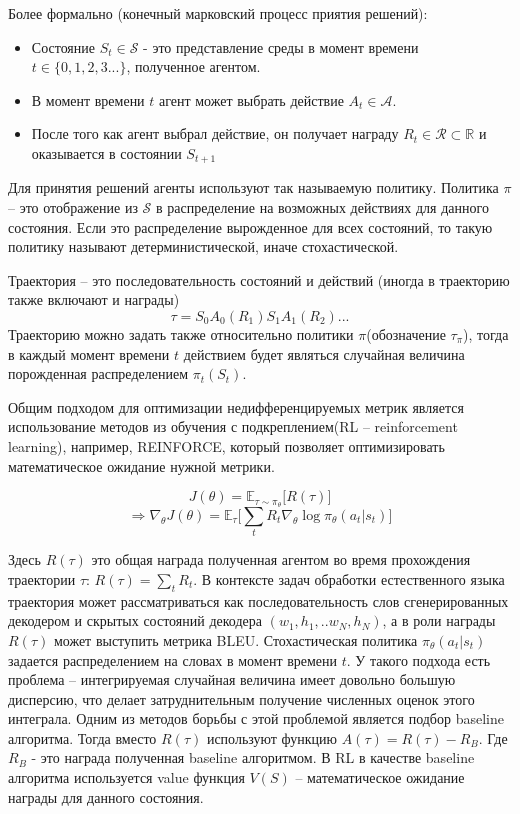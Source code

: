 \documentclass[14pt, a4paper]{extarticle}
\begin{document}
Более формально (конечный марковский процесс приятия решений):
\begin{itemize}
  \item Состояние $S_t \in \mathcal{S}$ - это представление среды в момент времени $t \in \{0, 1, 2, 3 ...\}$, полученное агентом.
  \item В момент времени $t$ агент может выбрать действие $A_t \in  \mathcal{A}$.
  \item После того как агент выбрал действие,
 он получает награду $R_t \in \mathcal{R} \subset \mathbb{R}$ и оказывается в состоянии $S_{t+1}$
\end{itemize}

Для принятия решений агенты используют так называемую политику. Политика $\pi$ -- это отображение из $\mathcal{S}$ в
распределение на возможных действиях для данного состояния. Если это распределение вырожденное для всех состояний, то такую политику называют детерминистической,
иначе стохастической.

Траектория -- это последовательность состояний и действий (иногда в траекторию также включают и  награды) $$\tau = S_0 A_0 (R_1) S_1 A_1 (R_2) ...$$
Траекторию можно задать также относительно политики $\pi$(обозначение $\tau_{\pi}$), тогда в каждый момент времени $t$ действием будет
являться случайная величина порожденная распределением $\pi_t(S_t)$.


Общим подходом для оптимизации недифференцируемых метрик является использование методов из обучения с подкреплением(RL -- reinforcement learning), 
например, REINFORCE, который позволяет оптимизировать
математическое ожидание нужной метрики.

$$J(\theta) = \mathbb{E}_{\tau\sim \pi_{\theta}} \lbrack R(\tau) \rbrack
$$
\begin{equation}
\Rightarrow \nabla_\theta J(\theta) = \mathbb{E}_{\tau} \lbrack \sum_t R_t \nabla_\theta\log \pi_{\theta}(a_t|s_t) \rbrack
\label{eq:reinforce_rule}
\end{equation}


Здесь $R(\tau)$ это общая награда полученная агентом во время прохождения траектории $\tau$: $R(\tau)=\sum_t R_t$. В контексте задач обработки естественного языка траектория может рассматриваться как последовательность слов сгенерированных декодером и скрытых состояний декодера $(w_1, h_1,..w_N, h_N)$, а в роли награды $R(\tau)$ может выступить метрика BLEU. Стохастическая политика $\pi_\theta(a_t|s_t)$ задается распределением на словах в момент времени $t$.
У такого подхода есть проблема -- интегрируемая случайная величина имеет довольно большую дисперсию, что делает затруднительным получение численных оценок этого интеграла.
Одним из методов борьбы с этой проблемой является подбор baseline алгоритма. Тогда вместо $R(\tau)$ используют функцию $A(\tau) = R(\tau) - R_{B}$.
Где $R_{B}$ - это награда полученная baseline алгоритмом. В RL в качестве baseline алгоритма используется value функция $V(S)$ -- математическое ожидание награды для данного состояния.
\end{document}
